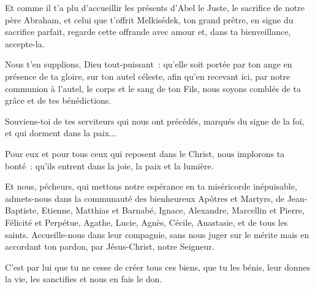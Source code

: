 Et comme il t'a plu d'accueillir les présents d'Abel le Juste, le
sacrifice de notre père Abraham, et celui que t'offrit Melkisédek, ton
grand prêtre, en signe du sacrifice parfait, regarde cette offrande
avec amour et, dans ta bienveillance, accepte-la. 


Nous t'en supplions,
Dieu tout-puissant~: qu'elle soit portée par ton ange en présence de
ta gloire, sur ton autel céleste, afin qu'en recevant ici, par notre
communion à l'autel, le corps et le sang de ton Fils,  nous soyons comblés de ta grâce et de tes 
bénédictions.


Souviens-toi de tes serviteurs qui nous ont précédés, marqués du signe
de la foi, et qui dorment dans la paix... 


Pour eux et pour tous ceux
qui reposent dans le Christ, nous implorons ta bonté~: qu'ils entrent
dans la joie, la paix et la lumière.

Et nous, pécheurs,  
qui mettons notre espérance en ta miséricorde
inépuisable, admets-nous dans la communauté des bienheureux Apôtres et
Martyrs, de Jean-Baptiste, Etienne, Matthias et Barnabé, Ignace,
Alexandre, Marcellin et Pierre, Félicité et Perpétue, Agathe, Lucie,
Agnès, Cécile, Anastasie, et de tous les saints. Accueille-nous dans
leur compagnie, sans nous juger sur le mérite mais en accordant ton
pardon, par Jésus-Christ, notre Seigneur. 

C'est par lui que tu ne cesse de créer tous ces biens, que tu les
bénis, leur donnes la vie, les sanctifies et nous en fais le don.


